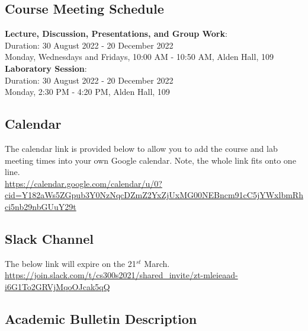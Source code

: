 \documentclass[11pt]{article} %
\begin{document}
\subsection*{\textbf{Course Meeting Schedule}}


\textbf{Lecture, Discussion, Presentations, and Group Work}:\\
\noindent
Duration: 30 August 2022 - 20 December 2022\\
Monday, Wednesdays and Fridays, 10:00 AM - 10:50 AM, Alden Hall, 109\\


\noindent
\textbf{Laboratory Session}:\\
Duration: 30 August 2022 - 20 December 2022\\
Monday, 2:30 PM - 4:20 PM, Alden Hall, 109\\



\subsection*{\textbf{Calendar}}
The calendar link is provided below to allow you to add the course and lab meeting times into your own Google calendar. Note, the whole link fits onto one line.\\
{\footnotesize
\url{https://calendar.google.com/calendar/u/0?cid=Y182aWs5ZGpub3Y0NzNqcDZmZ2YxZjUxMG00NEBncm91cC5jYWxlbmRhci5nb29nbGUuY29t} }



\subsection*{\textbf{Slack Channel}}
The below link will expire on the 21$^{st}$ March.\\
{\footnotesize
\url{https://join.slack.com/t/cs300s2021/shared_invite/zt-mleieaad-i6G1To2GRVjMqoOJcak5qQ} }



\subsection*{\textbf{Academic Bulletin Description}}
\end{document}
